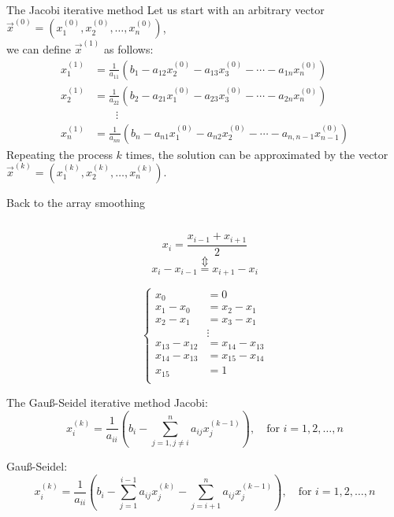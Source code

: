 \documentclass[UKenglish,aspectratio=169]{beamer}
\begin{document}
\begin{frame}{The Jacobi iterative method}
Let us start with an arbitrary vector $\vec{x}^{(0)}=\left(x_1^{(0)}, x_2^{(0)}, \dots, x_n^{(0)}\right)$,\\
\pause
we can define $\vec{x}^{(1)}$ as follows:
\begin{align*}
x_1^{(1)} &= \frac{1}{a_{11}}(b_1 - a_{12}x_2^{(0)} - a_{13}x_3^{(0)} - \cdots - a_{1n}x_n^{(0)})\\
x_2^{(1)} &= \frac{1}{a_{22}}(b_2 - a_{21}x_1^{(0)} - a_{23}x_3^{(0)} - \cdots - a_{2n}x_n^{(0)})\\
    & \qquad \vdots \\
x_n^{(1)} &= \frac{1}{a_{nn}}(b_n - a_{n1}x_1^{(0)} - a_{n2}x_2^{(0)} - \cdots - a_{n,n-1}x_{n-1}^{(0)})
\end{align*}
\pause
Repeating the process $k$ times, the solution can be approximated by the vector $\vec{x}^{(k)}=\left(x_1^{(k)}, x_2^{(k)}, \dots, x_n^{(k)}\right)$.
\end{frame}

\begin{frame}{Back to the array smoothing}
\inputminted[frame=single]{python}{listings/example_3.1.py}
\pause
\begin{minipage}{.45\linewidth}
$$x_i = \frac{x_{i-1}+x_{i+1}}{2}$$
\pause 
$$\Updownarrow$$ $$ x_i-x_{i-1} = x_{i+1} - x_i$$
\end{minipage}
\pause
\begin{minipage}{.45\linewidth}
$$
\left\{
\begin{array}{rl}
 x_0 &= 0 \\
x_1-x_0 &= x_2-x_1 \\
x_2-x_1 &= x_3-x_1 \\
     &  \vdots \\
x_{13}-x_{12}     &= x_{14}-x_{13} \\
x_{14}-x_{13}     &= x_{15}-x_{14} \\
x_{15} &= 1 \\
\end{array}
\right.
$$
\end{minipage}
\end{frame}

\begin{frame}{The Gauß-Seidel iterative method}
Jacobi:
$$
x_i^{(k)} = \frac{1}{a_{ii}} \left(b_i - \sum\limits_{j=1,j\neq i}^n a_{ij}x_j^{(k-1)} \right), \quad \text{for } i=1,2,\dots,n
$$
\pause

\vspace{47pt}
Gauß-Seidel:
$$
x_i^{(k)} = \frac{1}{a_{ii}} \left(b_i - \sum\limits_{j=1}^{i-1} a_{ij}x_j^{(k)} -  \sum\limits_{j=i+1}^n a_{ij}x_j^{(k-1)} \right), \quad \text{for } i=1,2,\dots,n
$$
\end{frame}
\end{document}
